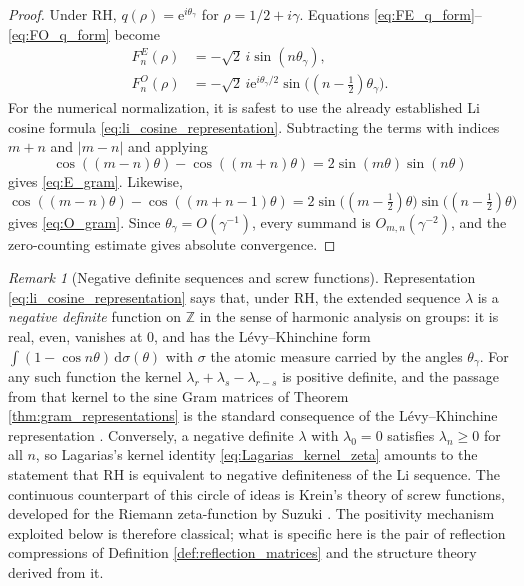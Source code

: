\documentclass[preprint,12pt]{elsarticle}
\numberwithin{equation}{section}
\theoremstyle{plain}
\theoremstyle{definition}
\theoremstyle{remark}
\newtheorem{remark}[theorem]{Remark}
\newcommand{\RH}{\mathrm{RH}}
\newcommand{\e}{\mathrm e}
\newcommand{\dd}{\,\mathrm d}
\begin{document}
\begin{proof}
Under $\RH$, $q(\rho)=\e^{i\theta_\gamma}$ for $\rho=1/2+i\gamma$. Equations \eqref{eq:FE_q_form}--\eqref{eq:FO_q_form} become
\begin{align}
F_n^E(\rho)
&=-\sqrt2\,i\sin(n\theta_\gamma),
\label{eq:FE_on_zero}\\
F_n^O(\rho)
&=-\sqrt2\,i\e^{i\theta_\gamma/2}
\sin\bigl((n-\tfrac12)\theta_\gamma\bigr).
\label{eq:FO_on_zero}
\end{align}
For the numerical normalization, it is safest to use the already established Li cosine formula \eqref{eq:li_cosine_representation}. Subtracting the terms with indices $m+n$ and $|m-n|$ and applying
\begin{equation}
\cos((m-n)\theta)-\cos((m+n)\theta)
=2\sin(m\theta)\sin(n\theta)
\label{eq:integer_sine_identity}
\end{equation}
gives \eqref{eq:E_gram}. Likewise,
\begin{equation}
\cos((m-n)\theta)-\cos((m+n-1)\theta)
=2\sin\bigl((m-\tfrac12)\theta\bigr)
\sin\bigl((n-\tfrac12)\theta\bigr)
\label{eq:half_integer_sine_identity}
\end{equation}
gives \eqref{eq:O_gram}. Since $\theta_\gamma=O(\gamma^{-1})$, every summand is $O_{m,n}(\gamma^{-2})$, and the zero-counting estimate gives absolute convergence.
\end{proof}

\begin{remark}[Negative definite sequences and screw functions]
\label{rem:negative_definite_context}
Representation \eqref{eq:li_cosine_representation} says that, under $\RH$, the extended sequence $\lambda$ is a \emph{negative definite} function on $\mathbb Z$ in the sense of harmonic analysis on groups: it is real, even, vanishes at $0$, and has the L\'evy--Khinchine form $\int(1-\cos n\theta)\dd\sigma(\theta)$ with $\sigma$ the atomic measure carried by the angles $\theta_\gamma$. For any such function the kernel $\lambda_r+\lambda_s-\lambda_{r-s}$ is positive definite, and the passage from that kernel to the sine Gram matrices of Theorem \ref{thm:gram_representations} is the standard consequence of the L\'evy--Khinchine representation \cite{Schoenberg1938,BergChristensenRessel1984}. Conversely, a negative definite $\lambda$ with $\lambda_0=0$ satisfies $\lambda_n\ge0$ for all $n$, so Lagarias's kernel identity \eqref{eq:Lagarias_kernel_zeta} amounts to the statement that $\RH$ is equivalent to negative definiteness of the Li sequence. The continuous counterpart of this circle of ideas is Krein's theory of screw functions, developed for the Riemann zeta-function by Suzuki \cite{Suzuki2023Norms,Suzuki2023Screw,Suzuki2025Hilbert}. The positivity mechanism exploited below is therefore classical; what is specific here is the pair of reflection compressions of Definition \ref{def:reflection_matrices} and the structure theory derived from it.
\end{remark}
\end{document}
